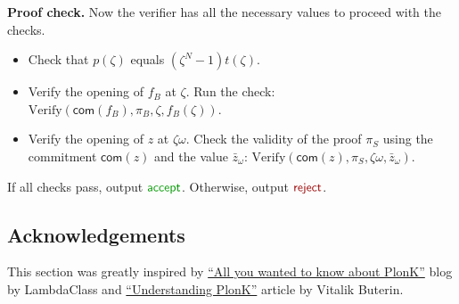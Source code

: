 \documentclass[../../book.tex]{subfiles}
\begin{document}
\textcolor{blue!60!black}{\textbf{Proof check.}} Now the verifier has all the
necessary values to proceed with the checks.
\begin{itemize}
    \item Check that $p(\zeta)$ equals $(\zeta^N - 1)t(\zeta)$.
    \item Verify the opening of $f_{B}$ at $\zeta$. 
    Run the check: $
            \text{Verify}(\mathsf{com}(f_{B}), \pi_{B}, \zeta, f_{B}(\zeta))
            $.
    \item Verify the opening of $z$ at $\zeta\omega$. 
    Check the
    validity of the proof $\pi_{S}$ using the commitment $\mathsf{com}(z)$ and the
    value $\bar{z}_{\omega}$: $
            \text{Verify}(\mathsf{com}(z), \pi_{S}, \zeta\omega, \bar{z}_{\omega})
            $.
\end{itemize}

If all checks pass, output $\textcolor{green!60!black}{\mathsf{accept}}$.
Otherwise, output $\textcolor{red!60!black}{\mathsf{reject}}$.

\subsection*{Acknowledgements}

This section was greatly inspired by
\href{https://blog.lambdaclass.com/all-you-wanted-to-know-about-plonk/}{``All
you wanted to know about PlonK''} blog by LambdaClass and
\href{https://vitalik.eth.limo/general/2019/09/22/plonk.html}{``Understanding
PlonK''} article by Vitalik Buterin.
\end{document}
